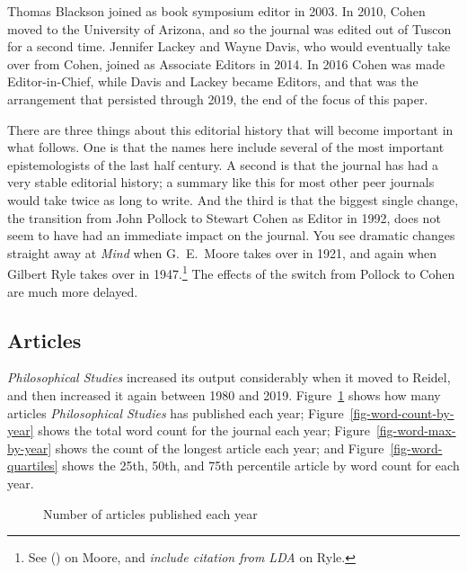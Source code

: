 \documentclass[
  10pt,
  letterpaper,
  DIV=11,
  numbers=noendperiod,
  twoside]{scrartcl}
\begin{document}
Thomas Blackson joined as book symposium editor in 2003. In 2010, Cohen
moved to the University of Arizona, and so the journal was edited out of
Tuscon for a second time. Jennifer Lackey and Wayne Davis, who would
eventually take over from Cohen, joined as Associate Editors in 2014. In
2016 Cohen was made Editor-in-Chief, while Davis and Lackey became
Editors, and that was the arrangement that persisted through 2019, the
end of the focus of this paper.

There are three things about this editorial history that will become
important in what follows. One is that the names here include several of
the most important epistemologists of the last half century. A second is
that the journal has had a very stable editorial history; a summary like
this for most other peer journals would take twice as long to write. And
the third is that the biggest single change, the transition from John
Pollock to Stewart Cohen as Editor in 1992, does not seem to have had an
immediate impact on the journal. You see dramatic changes straight away
at \emph{Mind} when G.~E.~Moore takes over in 1921, and again when
Gilbert Ryle takes over in 1947.\footnote{See
  () on Moore, and
  \emph{include citation from LDA} on Ryle.} The effects of the switch
from Pollock to Cohen are much more delayed.

\subsection{Articles}\label{articles}

\emph{Philosophical Studies} increased its output considerably when it
moved to Reidel, and then increased it again between 1980 and 2019.
Figure~\ref{fig-article-count-by-year} shows how many articles
\emph{Philosophical Studies} has published each year;
Figure~\ref{fig-word-count-by-year} shows the total word count for the
journal each year; Figure~\ref{fig-word-max-by-year} shows the count of
the longest article each year; and Figure~\ref{fig-word-quartiles} shows
the 25th, 50th, and 75th percentile article by word count for each year.

\begin{figure}


\caption{\label{fig-article-count-by-year}Number of articles published
each year}

\end{figure}%
\end{document}
